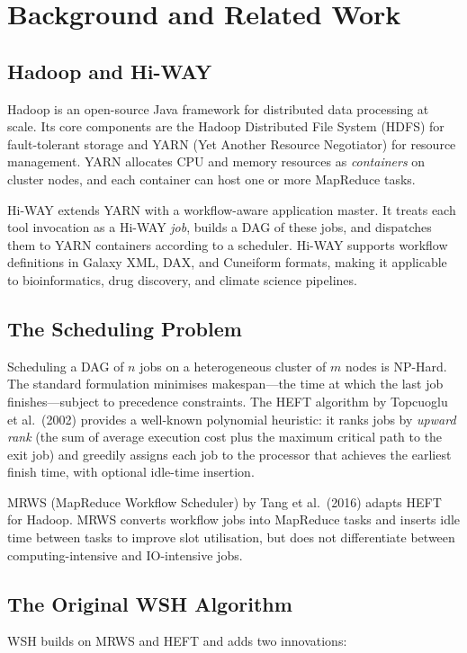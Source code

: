 \documentclass[12pt,a4paper]{article}
\begin{document}
\section{Background and Related Work}
\label{sec:background}

\subsection{Hadoop and Hi-WAY}
Hadoop is an open-source Java framework for distributed data processing at scale. Its core components are the Hadoop Distributed File System (HDFS) for fault-tolerant storage and YARN (Yet Another Resource Negotiator) for resource management. YARN allocates CPU and memory resources as \textit{containers} on cluster nodes, and each container can host one or more MapReduce tasks.

Hi-WAY extends YARN with a workflow-aware application master. It treats each tool invocation as a Hi-WAY \textit{job}, builds a DAG of these jobs, and dispatches them to YARN containers according to a scheduler. Hi-WAY supports workflow definitions in Galaxy XML, DAX, and Cuneiform formats, making it applicable to bioinformatics, drug discovery, and climate science pipelines.

\subsection{The Scheduling Problem}
Scheduling a DAG of $n$ jobs on a heterogeneous cluster of $m$ nodes is NP-Hard. The standard formulation minimises makespan---the time at which the last job finishes---subject to precedence constraints. The HEFT algorithm by Topcuoglu et al.\ (2002) provides a well-known polynomial heuristic: it ranks jobs by \textit{upward rank} (the sum of average execution cost plus the maximum critical path to the exit job) and greedily assigns each job to the processor that achieves the earliest finish time, with optional idle-time insertion.

MRWS (MapReduce Workflow Scheduler) by Tang et al.\ (2016) adapts HEFT for Hadoop. MRWS converts workflow jobs into MapReduce tasks and inserts idle time between tasks to improve slot utilisation, but does not differentiate between computing-intensive and IO-intensive jobs.

\subsection{The Original WSH Algorithm}
\label{sec:wsh_original}
WSH builds on MRWS and HEFT and adds two innovations:
\end{document}

